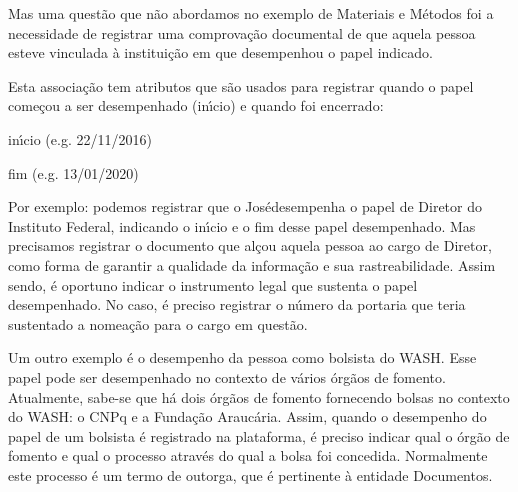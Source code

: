 \documentclass[
12pt,		%
openright,	%
twoside,  %
a4paper,			%
chapter=TITLE,		%
english,			%
french,				%
spanish,			%
brazil				%
]{USPSC-classe/USPSC}
\begin{document}
Mas uma quest\~ao que n\~ao abordamos no exemplo de Materiais e M\'etodos foi a necessidade de registrar uma comprova\c{c}\~ao documental de que aquela pessoa esteve vinculada \`a institui\c{c}\~ao em que desempenhou o papel indicado.









Esta associa\c{c}\~ao tem atributos que s\~ao usados para registrar quando o papel come\c{c}ou a ser desempenhado (in\'{\i}cio) e quando foi encerrado:










\begin{alineas}
\item in\'{\i}cio (e.g. 22/11/2016)
\item fim (e.g. 13/01/2020)
\end{alineas}

Por exemplo: podemos registrar que o \textquotedbl Jos\'e\textquotedbl  desempenha o papel de Diretor do Instituto Federal, indicando o in\'{\i}cio e o fim desse papel desempenhado. Mas precisamos registrar o documento que al\c{c}ou aquela pessoa ao cargo de Diretor, como forma de garantir a qualidade da informa\c{c}\~ao e sua rastreabilidade. Assim sendo, \'e oportuno indicar o instrumento legal que sustenta o papel desempenhado. No caso, \'e preciso registrar o n\'umero da portaria que teria sustentado a nomea\c{c}\~ao para o cargo em quest\~ao.









Um outro exemplo \'e o desempenho da pessoa como bolsista do WASH. Esse papel pode ser desempenhado no contexto de v\'arios \'org\~aos de fomento. Atualmente, sabe-se que h\'a dois \'org\~aos de fomento fornecendo bolsas no contexto do WASH: o CNPq e a Funda\c{c}\~ao Arauc\'aria. Assim, quando o desempenho do papel de um bolsista \'e registrado na plataforma, \'e preciso indicar qual o \'org\~ao de fomento e qual o processo atrav\'es do qual a bolsa foi concedida. Normalmente este processo \'e um termo de outorga, que \'e pertinente \`a entidade \textquotedbl Documentos\textquotedbl .
\end{document}
